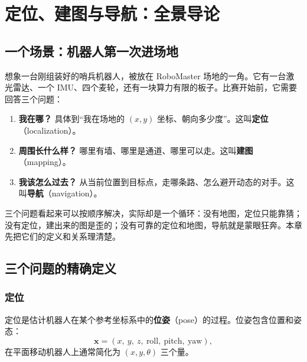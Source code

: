 \chapter{定位、建图与导航：全景导论}\label{ch:01-overview}


\section{一个场景：机器人第一次进场地}\label{sec:01-scene}

想象一台刚组装好的哨兵机器人，被放在 RoboMaster 场地的一角。它有一台激光雷达、一个 IMU、四个麦轮，还有一块算力有限的板子。比赛开始前，它需要回答三个问题：

\begin{enumerate}
  \item \textbf{我在哪？} 具体到“我在场地的 $(x,y)$ 坐标、朝向多少度”。这叫\textbf{定位}（localization）。
  \item \textbf{周围长什么样？} 哪里有墙、哪里是通道、哪里可以走。这叫\textbf{建图}（mapping）。
  \item \textbf{我该怎么过去？} 从当前位置到目标点，走哪条路、怎么避开动态的对手。这叫\textbf{导航}（navigation）。
\end{enumerate}

三个问题看起来可以按顺序解决，实际却是一个循环：没有地图，定位只能靠猜；没有定位，建出来的图是歪的；没有可靠的定位和地图，导航就是蒙眼狂奔。本章先把它们的定义和关系理清楚。

\section{三个问题的精确定义}\label{sec:01-def}

\subsection{定位}

\begin{definition}[定位]
定位是估计机器人在某个参考坐标系中的\textbf{位姿}（pose）的过程。位姿包含位置和姿态：
\begin{equation}
\bm{x}=\left(x,\ y,\ z,\ \text{roll},\ \text{pitch},\ \text{yaw}\right),
\end{equation}
在平面移动机器人上通常简化为 $(x,y,\theta)$ 三个量。
\end{definition}

